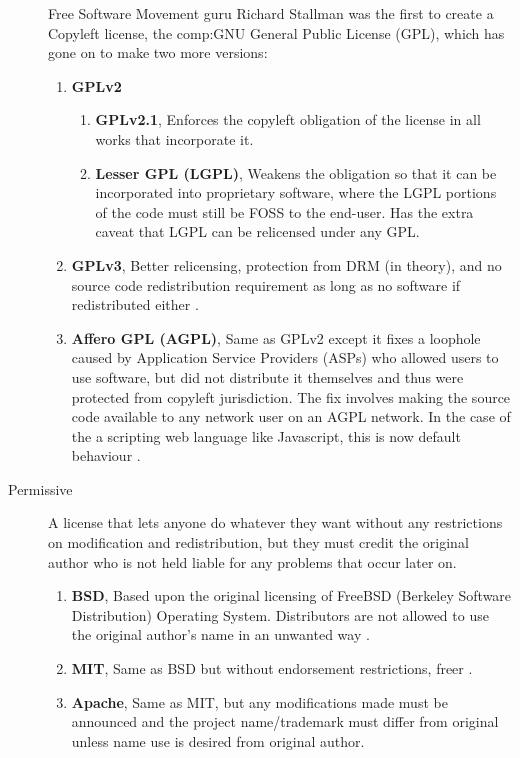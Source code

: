 \begin{description}
{Free Software Movement guru Richard Stallman was the first to create a Copyleft license, the \gls{comp:GNU} \citep{stallman1998gnu} General Public License (GPL), which has gone on to make two more versions:
	\begin{enumerate}
	\item{\textbf{GPLv2}
		\begin{enumerate}
		\item{\textbf{GPLv2.1}, Enforces the copyleft obligation of the license in all works that incorporate it.}
		\item{\textbf{Lesser GPL (LGPL)}, Weakens the obligation so that it can be incorporated into proprietary software, where the LGPL portions of the code must still be FOSS to the end-user. Has the extra caveat that LGPL can be relicensed under any GPL.}
		\end{enumerate}
	}
	\item{\textbf{GPLv3}, Better relicensing, protection from DRM (in theory), and no source code redistribution requirement as long as no software if redistributed either \citep{gplv3}.}
	\item{\textbf{Affero GPL (AGPL)}, Same as GPLv2 except it fixes a loophole caused by Application Service Providers (ASPs) who allowed users to use software, but did not distribute it themselves and thus were protected from copyleft jurisdiction. The fix involves making the source code available to any network user on an AGPL network. In the case of the a scripting web language like Javascript, this is now default behaviour \citep{agplv3}.}
	\end{enumerate}
	}
\item[Permissive]{
A license that lets anyone do whatever they want without any restrictions on modification and redistribution, but they must credit the original author who is not held liable for any problems that occur later on.
	\begin{enumerate}
	\item{\textbf{BSD}, Based upon the original licensing of FreeBSD (Berkeley Software Distribution) Operating System. Distributors are not allowed to use the original author's name in an unwanted way \citep{bsd}.}
	\item{\textbf{MIT}, Same as BSD but without endorsement restrictions, freer \citep{mit}.}
	\item{\textbf{Apache}, Same as MIT, but any modifications made must be announced and the project name/trademark must differ from original unless name use is desired from original author.}
	\end{enumerate}
}
\end{description}


